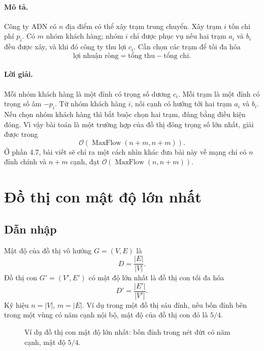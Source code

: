 \documentclass[11pt]{article}
\newcommand{\Oh}{\mathcal{O}}
\begin{document}
\paragraph{Mô tả.}
Công ty ADN có \(n\) địa điểm có thể xây trạm trung chuyển. Xây trạm \(i\) tốn
chi phí \(p_i\). Có \(m\) nhóm khách hàng; nhóm \(i\) chỉ được phục vụ nếu
hai trạm \(a_i\) và \(b_i\) đều được xây, và khi đó công ty thu lợi \(c_i\).
Cần chọn các trạm để tối đa hóa
\[
  \text{lợi nhuận ròng}=\text{tổng thu}-\text{tổng chi}.
\]

\paragraph{Lời giải.}
Mỗi nhóm khách hàng là một đỉnh có trọng số dương \(c_i\). Mỗi trạm là một
đỉnh có trọng số âm \(-p_i\). Từ nhóm khách hàng \(i\), nối cạnh có hướng tới
hai trạm \(a_i\) và \(b_i\). Nếu chọn nhóm khách hàng thì bắt buộc chọn hai
trạm, đúng bằng điều kiện đóng. Vì vậy bài toán là một trường hợp của đồ thị
đóng trọng số lớn nhất, giải được trong
\[
  \Oh(\operatorname{MaxFlow}(n+m,n+m)).
\]
Ở phần 4.7, bài viết sẽ chỉ ra một cách nhìn khác đưa bài này về mạng chỉ có
\(n\) đỉnh chính và \(n+m\) cạnh, đạt
\(\Oh(\operatorname{MaxFlow}(n,n+m))\).

\section{Đồ thị con mật độ lớn nhất}

\subsection{Dẫn nhập}

Mật độ của đồ thị vô hướng \(G=(V,E)\) là
\[
  D=\frac{|E|}{|V|}.
\]
Đồ thị con \(G'=(V',E')\) có mật độ lớn nhất là đồ thị con tối đa hóa
\[
  D'=\frac{|E'|}{|V'|}.
\]
Ký hiệu \(n=|V|\), \(m=|E|\). Ví dụ trong một đồ thị sáu đỉnh, nếu bốn đỉnh
bên trong một vùng có năm cạnh nội bộ, mật độ của đồ thị con đó là \(5/4\).

\begin{figure}[htbp]
\centering
{}
\caption{Ví dụ đồ thị con mật độ lớn nhất: bốn đỉnh trong nét đứt có năm cạnh,
mật độ \(5/4\).}
\end{figure}
\end{document}
